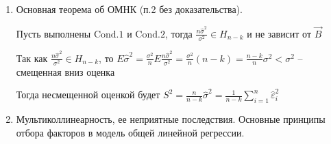 \begin{enumerate}
\begin{enumerate}
        \begin{MyProof}
            $\vec B - \vec \beta = A^{-1} Z \vec X - \vec \beta = A^{-1} Z (Z^T \vec \beta + \vec \varepsilon) - \vec \beta = A^{-1} Z \vec \varepsilon$
        \end{MyProof}

        \item $\vec B$ -- несмещенная оценка для вектора $\vec \beta$

        \begin{MyProof}
            $E(\vec B - \vec \beta) = E(A^{-1} Z \vec \varepsilon) = A^{-1} Z E \vec \varepsilon = 0 \Longrightarrow E \vec B = \vec \beta$
        \end{MyProof}

        \item Матрица ковариаций $D \vec B = \sigma^2 A^{-1}$

        \begin{MyProof}
            $D \vec B = D (\vec B - \vec \beta) = D (A^{-1} Z \vec \varepsilon) = A^{-1} Z D \vec \varepsilon A^{-1 T} Z^T = A^{-1} Z \sigma^2 E_n A^{-1 T} Z^T = \sigma^2 A^{-1} (Z Z^T) A^{-1} = \sigma^2 A^{-1}$
        \end{MyProof}

        Следствие: дисперсии оценок $b_i$ можно выразить через $\sigma^2$ и коэффициенты матрицы $A^{-1}$: $D b_i = \sigma^2 (A^{-1})_{ii}$

    \end{enumerate}

    \item Основная теорема об ОМНК (п.2 без доказательства).

    \begin{MyTheorem}
        Пусть выполнены $\mathrm{Cond. 1}$ и $\mathrm{Cond. 2}$, тогда $\frac{n \hat \sigma^2}{\sigma^2} \in H_{n - k}$ и не зависит от $\vec B$
    \end{MyTheorem}
    
    Так как $\frac{n \hat \sigma^2}{\sigma^2} \in H_{n - k}$, то $E \hat \sigma^2 = \frac{\sigma^2}{n} E \frac{n \hat \sigma^2}{\sigma^2} = \frac{\sigma^2}{n} (n - k) = \frac{n - k}{n} \sigma^2 < \sigma^2$ -- смещенная вниз оценка
    
    Тогда несмещенной оценкой будет $S^2 = \frac{n}{n - k} \hat \sigma^2 = \frac{1}{n - k} \sum_{i = 1}^n \hat \varepsilon_i^2$

    \item Мультиколлинеарность, ее неприятные последствия. Основные принципы отбора факторов в модель общей линейной регрессии.


\end{enumerate}
